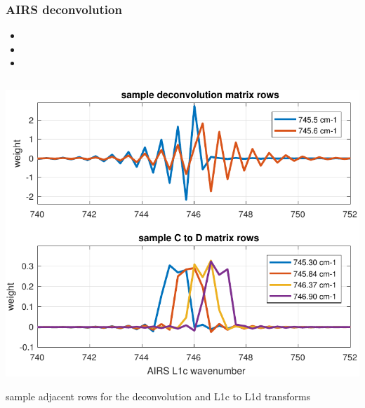 
\begin{frame}
\frametitle{AIRS deconvolution}
\begin{itemize}

  \item

  \item

  \item

\end{itemize}
\end{frame}

\begin{column}{0.5\textwidth}
  \begin{centering}
  \includegraphics[width=\textwidth]{figures/airs_decon_basis.pdf}
  \end{centering}
  sample adjacent rows for the deconvolution and L1c to L1d
    transforms

\end{column}

